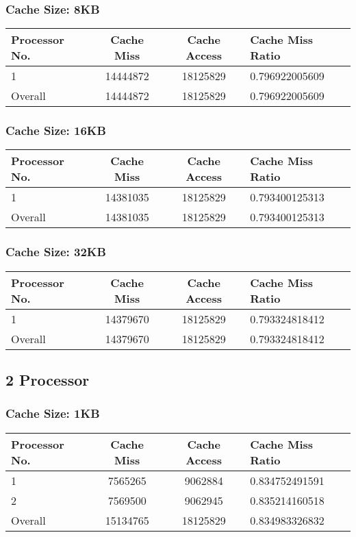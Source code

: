 \documentclass[]{article}
\begin{document}
\subsubsection{Cache Size: 8KB}
\begin{tabularx}{\textwidth}{ | l | c | c | X | }
\hline
Processor No.    & Cache Miss    & Cache Access  &   Cache Miss Ratio \\
\hline
1    & 14444872  & 18125829    & 0.796922005609 \\
\hline
Overall & 14444872    & 18125829  & 0.796922005609 \\
\hline
\end{tabularx}


\subsubsection{Cache Size: 16KB}
\begin{tabularx}{\textwidth}{ | l | c | c | X | }
\hline
Processor No.    & Cache Miss    & Cache Access  &   Cache Miss Ratio \\
\hline
1    & 14381035  & 18125829    & 0.793400125313 \\
\hline
Overall & 14381035    & 18125829  & 0.793400125313 \\
\hline
\end{tabularx}


\subsubsection{Cache Size: 32KB}
\begin{tabularx}{\textwidth}{ | l | c | c | X | }
\hline
Processor No.    & Cache Miss    & Cache Access  &   Cache Miss Ratio \\
\hline
1    & 14379670  & 18125829    & 0.793324818412 \\
\hline
Overall & 14379670    & 18125829  & 0.793324818412 \\
\hline
\end{tabularx}
\pagebreak


\subsection{2 Processor}
\subsubsection{Cache Size: 1KB}
\begin{tabularx}{\textwidth}{ | l | c | c | X | }
\hline
Processor No.    & Cache Miss    & Cache Access  &   Cache Miss Ratio \\
\hline
1    & 7565265  & 9062884    & 0.834752491591 \\
\hline
2    & 7569500  & 9062945    & 0.835214160518 \\
\hline
Overall & 15134765    & 18125829  & 0.834983326832 \\
\hline
\end{tabularx}
\end{document}
